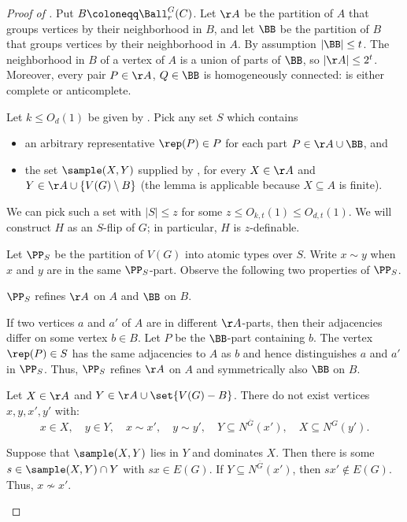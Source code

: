 \begin{proof}[Proof of ]
    Put $B\coloneqq \Ball_r^G(C)$.
    Let $\AA$ be the partition of $A$ that groups vertices by their neighborhood in $B$, and let $\BB$ be the partition of $B$ that groups vertices by their neighborhood in $A$.
    By assumption $|\BB|\leq t$.
    The neighborhood in $B$ of a vertex of $A$ is a union of parts of $\BB$, so $|\AA|\leq2^t$.
    Moreover, every pair $P\in\AA$, $Q\in\BB$ is homogeneously connected: is either complete or anticomplete.

    Let $k \leq O_d(1)$ be given by .
    Pick any set $S$ which contains
    \begin{itemize}
        \item an arbitrary representative $\rep(P)\in P$ for each part $P\in\AA\cup\BB$, and
        \item
        the set $\sample(X,Y)$ supplied by , for every $X\in\AA$ and $Y\in\AA\cup\{V(G)\setminus B\}$
        (the lemma is applicable because $X \subseteq A$ is finite).
    \end{itemize}
    We can pick such a set with $|S|\le z$ for some $z\le O_{k,t}(1)\le O_{d,t}(1)$.
    We will construct $H$ as an $S$-flip of $G$; in particular, $H$ is $z$-definable.

    Let $\PP_S$ be the partition of $V(G)$ into atomic types over $S$.
    Write $x\sim y$ when $x$ and $y$ are in the same $\PP_S$-part.
    Observe the following two properties of $\PP_S$.

    \begin{claim}
    $\PP_S$ refines $\AA$ on $A$ and $\BB$ on $B$.
    \end{claim}
    \begin{claimproof}
        If two vertices $a$ and $a'$ of $A$ are in different $\AA$-parts, then their adjacencies differ on some vertex $b \in B$.
        Let $P$ be the $\BB$-part containing $b$.
        The vertex $\rep(P) \in S$ has the same adjacencies to $A$ as $b$ and hence distinguishes $a$ and $a'$ in $\PP_S$.
        Thus, $\PP_S$ refines $\AA$ on $A$ and symmetrically also $\BB$ on $B$.
    \end{claimproof}

    \begin{claim}\label{clm:dagger}
    Let $X\in \AA$ and $Y\in \AA\cup\set{V(G)-B}$.
    There do not exist vertices $x,y,x',y'$ with:
    \begin{equation}\tag{$\dagger$}\label{eq:ball-flip-crossing}
        x\in X,\quad y\in Y,\quad x\sim x',\quad y\sim y',
        \quad Y\subseteq N^{\overline G}(x'),\quad X\subseteq N^G(y').
    \end{equation}
    \end{claim}
    \begin{claimproof}
    Suppose that $\sample(X,Y)$ lies in $Y$ and dominates $X$.
    Then there is some  $s\in\sample(X,Y)\cap Y$ with $sx\in E(G)$.
    If
    $Y\subseteq N^{\overline G}(x')$,
then $sx'\notin E(G)$.
Thus, $x\nsim x'$.


\end{claimproof}
\end{proof}
